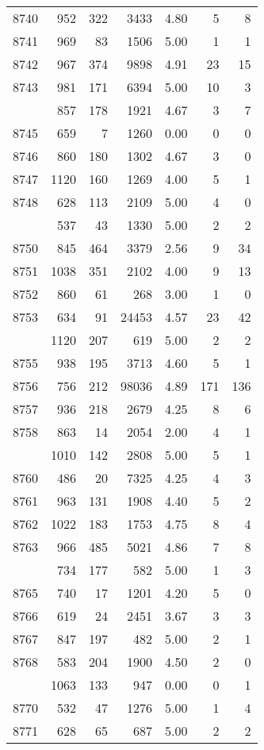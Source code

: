 \documentclass[
]{article}
\begin{document}
\begin{table}
\begin{tabular}[t]{lrrrrrr}
8740 & 952 & 322 & 3433 & 4.80 & 5 & 8\\
8741 & 969 & 83 & 1506 & 5.00 & 1 & 1\\
8742 & 967 & 374 & 9898 & 4.91 & 23 & 15\\
8743 & 981 & 171 & 6394 & 5.00 & 10 & 3\\
\addlinespace
8744 & 857 & 178 & 1921 & 4.67 & 3 & 7\\
8745 & 659 & 7 & 1260 & 0.00 & 0 & 0\\
8746 & 860 & 180 & 1302 & 4.67 & 3 & 0\\
8747 & 1120 & 160 & 1269 & 4.00 & 5 & 1\\
8748 & 628 & 113 & 2109 & 5.00 & 4 & 0\\
\addlinespace
8749 & 537 & 43 & 1330 & 5.00 & 2 & 2\\
8750 & 845 & 464 & 3379 & 2.56 & 9 & 34\\
8751 & 1038 & 351 & 2102 & 4.00 & 9 & 13\\
8752 & 860 & 61 & 268 & 3.00 & 1 & 0\\
8753 & 634 & 91 & 24453 & 4.57 & 23 & 42\\
\addlinespace
8754 & 1120 & 207 & 619 & 5.00 & 2 & 2\\
8755 & 938 & 195 & 3713 & 4.60 & 5 & 1\\
8756 & 756 & 212 & 98036 & 4.89 & 171 & 136\\
8757 & 936 & 218 & 2679 & 4.25 & 8 & 6\\
8758 & 863 & 14 & 2054 & 2.00 & 4 & 1\\
\addlinespace
8759 & 1010 & 142 & 2808 & 5.00 & 5 & 1\\
8760 & 486 & 20 & 7325 & 4.25 & 4 & 3\\
8761 & 963 & 131 & 1908 & 4.40 & 5 & 2\\
8762 & 1022 & 183 & 1753 & 4.75 & 8 & 4\\
8763 & 966 & 485 & 5021 & 4.86 & 7 & 8\\
\addlinespace
8764 & 734 & 177 & 582 & 5.00 & 1 & 3\\
8765 & 740 & 17 & 1201 & 4.20 & 5 & 0\\
8766 & 619 & 24 & 2451 & 3.67 & 3 & 3\\
8767 & 847 & 197 & 482 & 5.00 & 2 & 1\\
8768 & 583 & 204 & 1900 & 4.50 & 2 & 0\\
\addlinespace
8769 & 1063 & 133 & 947 & 0.00 & 0 & 1\\
8770 & 532 & 47 & 1276 & 5.00 & 1 & 4\\
8771 & 628 & 65 & 687 & 5.00 & 2 & 2\\

\end{tabular}
\end{table}
\end{document}
